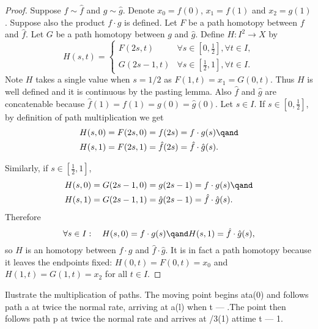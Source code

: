 \begin{proof}
    Suppose \(f\sim \hat{f}\) and \(g\sim \hat{g}\). Denote \(x_0 = f(0)\), \(x_1 = f(1)\) and \(x_2=g(1)\). Suppose also  the product \(f\cdot g\) is  defined. Let \(F\) be a path homotopy between \(f\) and \(\hat{f}\). Let \(G\) be a path homotopy between \({g}\) and \(\hat{g}\). Define \(H\colon I^2\to X\) by \[
        H(s,t) = \begin{cases}
            F(2s,t)&\forall s\in[ 0,\frac{1}{2}], \forall t\in I,\\
            G(2s-1,t)&\forall s\in [\frac{1}{2},1], \forall t\in I.
        \end{cases}
    \] Note \(H\) takes a single value when \(s=1/2\) as \(F(1, t) = x_1 = G(0,t)\). Thus \(H\) is well defined and it is continuous by the pasting lemma. Also \(\hat{f}\) and \(\hat{g}\) are concatenable because \(\hat{f} (1) = f(1) = g(0) = \hat{g}(0)\). Let \(s \in I\).
    If \(s\in[0,\frac{1}{2}]\), by definition of path multiplication we get
    \begin{align*}
        H(s,0) &= F(2s, 0) = f(2s) = f\cdot g (s)\qand\\
        H(s,1) &= F(2s, 1) = \hat{f}(2s) = \hat{f}\cdot \hat{g} (s).
    \end{align*}
    
    Similarly, if \(s\in[\frac{1}{2},1]\),
    \begin{align*}
        H(s,0) &= G(2s-1, 0) = g(2s-1) = f\cdot g (s)\qand\\
        H(s,1) &= G(2s-1, 1) = \hat{g}(2s-1) = \hat{f}\cdot \hat{g} (s).
    \end{align*}    
    Therefore \[
        \forall s\in I:\quad H(s,0)= f\cdot g (s)\qand H(s,1)= \hat{f}\cdot \hat{g} (s),
    \] so \(H\) is an homotopy between \(f\cdot g\) and \(\hat{f}\cdot \hat g\). It is in fact a path homotopy because it leaves the endpoints fixed: \(H(0,t) = F(0,t) = x_0\) and \(H(1,t) = G(1,t) = x_2\) for all \(t\in I\).
\end{proof}

\begin{example}
    Ilustrate the multiplication of paths.  The moving point begins ata(0) and follows path a at twice the normal rate, arriving at a(l) when t — .The point then follows path p at twice the normal rate and arrives at /3(1) attime t — 1.
\end{example}





